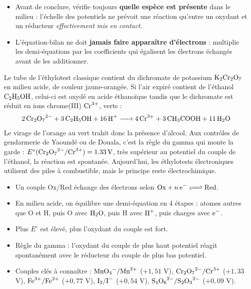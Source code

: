 \documentclass[11pt]{article}
\begin{document}
\begin{attention}
\begin{itemize}
\item Avant de conclure, vérifie toujours \textbf{quelle espèce est présente} dans le milieu : l'échelle des potentiels ne prévoit une réaction qu'entre un oxydant et un réducteur \emph{effectivement mis en contact}.
\item L'équation-bilan ne doit \textbf{jamais faire apparaître d'électrons} : multiplie les demi-équations par les coefficients qui égalisent les électrons échangés avant de les additionner.
\end{itemize}
\end{attention}

\begin{savaistu}
Le tube de l'éthylotest classique contient du dichromate de potassium $\ce{K2Cr2O7}$ en milieu acide, de couleur jaune-orangée. Si l'air expiré contient de l'éthanol $\ce{C2H5OH}$, celui-ci est oxydé en acide éthanoïque tandis que le dichromate est réduit en ions chrome(III) $\ce{Cr^3+}$, verts :
\[ \ce{2 Cr2O7^2- + 3 C2H5OH + 16 H+ -> 4 Cr^3+ + 3 CH3COOH + 11 H2O} \]
Le virage de l'orange au vert trahit donc la présence d'alcool. Aux contrôles de gendarmerie de Yaoundé ou de Douala, c'est la règle du gamma qui monte la garde : $E^\circ(\ce{Cr2O7^2-}/\ce{Cr^3+}) = \SI{+1,33}{V}$, très supérieur au potentiel du couple de l'éthanol, la réaction est spontanée. Aujourd'hui, les éthylotests électroniques utilisent des piles à combustible, mais le principe reste électrochimique.
\end{savaistu}

\begin{aretenir}
\begin{itemize}
\item Un couple Ox/Red échange des électrons selon $\text{Ox} + n\,\ce{e-} \ce{<=>} \text{Red}$.
\item En milieu acide, on équilibre une demi-équation en 4 étapes : atomes autres que O et H, puis O avec $\ce{H2O}$, puis H avec $\ce{H+}$, puis charges avec $\ce{e-}$.
\item Plus $E^\circ$ est élevé, plus l'oxydant du couple est fort.
\item Règle du gamma : l'oxydant du couple de plus haut potentiel réagit spontanément avec le réducteur du couple de plus bas potentiel.
\item Couples clés à connaître : $\ce{MnO4-}/\ce{Mn^2+}$ ($+1,51$ V), $\ce{Cr2O7^2-}/\ce{Cr^3+}$ ($+1,33$ V), $\ce{Fe^3+}/\ce{Fe^2+}$ ($+0,77$ V), $\ce{I2}/\ce{I-}$ ($+0,54$ V), $\ce{S4O6^2-}/\ce{S2O3^2-}$ ($+0,09$ V).
\end{itemize}
\end{aretenir}
\end{document}
